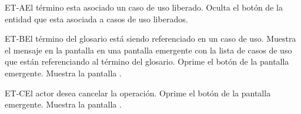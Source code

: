 	\begin{UCtrayectoriaA}{ET-A}{El término esta asociado un caso de uso liberado.}
		\UCpaso[\UCsist] Oculta el botón \eliminar de la entidad que esta asociada a casos de uso liberados.
	\end{UCtrayectoriaA}

	\begin{UCtrayectoriaA}{ET-B}{El término del glosario está siendo referenciado en un caso de uso.}
		\UCpaso[\UCsist] Muestra el mensaje  en la pantalla  en una pantalla emergente con la lista de casos de uso que están referenciando al término del glosario.
		\UCpaso[\UCactor] Oprime el botón  de la pantalla emergente.
		\UCpaso[\UCsist] Muestra la pantalla .
	\end{UCtrayectoriaA}


	\begin{UCtrayectoriaA}{ET-C}{El actor desea cancelar la operación.}
		\UCpaso[\UCactor] Oprime el botón  de la pantalla emergente.
		\UCpaso[\UCsist] Muestra la pantalla .
	\end{UCtrayectoriaA}
	

